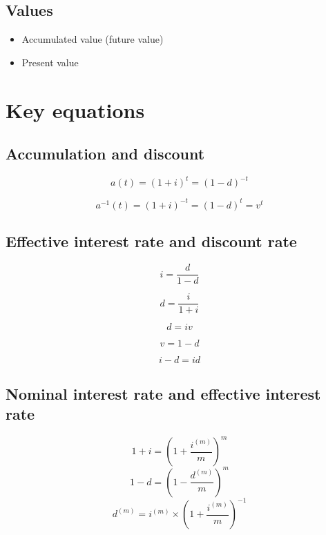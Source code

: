 \documentclass[
]{book}
\begin{document}
\hypertarget{values}{%
\subsection*{Values}\label{values}}

\begin{itemize}
\item
  Accumulated value (future value)
\item
  Present value
\end{itemize}

\hypertarget{key-equations}{%
\section{Key equations}\label{key-equations}}

\hypertarget{accumulation-and-discount}{%
\subsection*{Accumulation and discount}\label{accumulation-and-discount}}

\[a(t)=(1+i)^t=(1-d)^{-t}\]

\[a^{-1}(t)=(1+i)^{-t}=(1-d)^t=v^t\]

\hypertarget{effective-interest-rate-and-discount-rate}{%
\subsection*{Effective interest rate and discount rate}\label{effective-interest-rate-and-discount-rate}}

\[i=\frac{d}{1-d}\]

\[d=\frac{i}{1+i}\]

\[d=iv\]

\[v=1-d\]

\[i-d=id\]

\hypertarget{nominal-interest-rate-and-effective-interest-rate}{%
\subsection*{Nominal interest rate and effective interest rate}\label{nominal-interest-rate-and-effective-interest-rate}}

\[1+i=\left(1+\frac{i^{(m)}}{m}\right)^m\]
\[1-d=\left(1-\frac{d^{(m)}}{m}\right)^m\]
\[d^{(m)}=i^{(m)}\times\left(1+\frac{i^{(m)}}{m}\right)^{-1}\]
\end{document}
